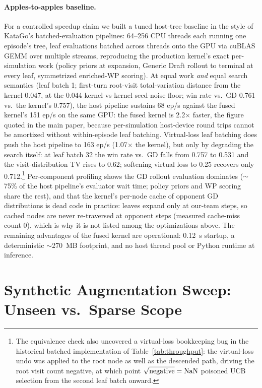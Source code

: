 \documentclass[journal]{IEEEtran}
\begin{document}
\paragraph{Apples-to-apples baseline.} For a controlled speedup claim we built a tuned host-tree baseline in the style of KataGo's batched-evaluation pipelines: 64--256 CPU threads each running one episode's tree, leaf evaluations batched across threads onto the GPU via cuBLAS GEMM over multiple streams, reproducing the production kernel's exact per-simulation work (policy priors at expansion, Generic Draft rollout to terminal at every leaf, symmetrized enriched-WP scoring). At equal work \textit{and} equal search semantics (leaf batch 1; first-turn root-visit total-variation distance from the kernel 0.047, at the 0.044 kernel-vs-kernel seed-noise floor; win rate vs.\ GD 0.761 vs.\ the kernel's 0.757), the host pipeline sustains 68 ep/s against the fused kernel's 151 ep/s on the same GPU: the fused kernel is 2.2$\times$ faster, the figure quoted in the main paper, because per-simulation host-device round trips cannot be amortized without within-episode leaf batching. Virtual-loss leaf batching does push the host pipeline to 163 ep/s (1.07$\times$ the kernel), but only by degrading the search itself: at leaf batch 32 the win rate vs.\ GD falls from 0.757 to 0.531 and the visit-distribution TV rises to 0.62; softening virtual loss to 0.25 recovers only 0.712.\footnote{The equivalence check also uncovered a virtual-loss bookkeeping bug in the historical batched implementation of Table~\ref{tab:throughput}: the virtual-loss undo was applied to the root node as well as the descended path, driving the root visit count negative, at which point $\sqrt{\smash[b]{\text{negative}}}=\text{NaN}$ poisoned UCB selection from the second leaf batch onward.} Per-component profiling shows the GD rollout evaluation dominates ($\sim$75\% of the host pipeline's evaluator wait time; policy priors and WP scoring share the rest), and that the kernel's per-node cache of opponent GD distributions is dead code in practice: leaves expand only at our-team steps, so cached nodes are never re-traversed at opponent steps (measured cache-miss count 0), which is why it is not listed among the optimizations above. The remaining advantages of the fused kernel are operational: 0.12~s startup, a deterministic $\sim$270~MB footprint, and no host thread pool or Python runtime at inference.

\section{Synthetic Augmentation Sweep: Unseen vs.\ Sparse Scope}
\end{document}
